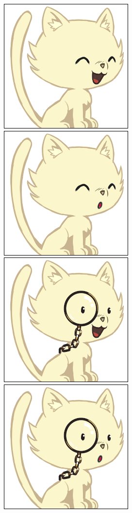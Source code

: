 \documentclass[a4paper, 12pt]{article}
\begin{document}
  \includegraphics[scale=0.45]{out/1.png}
  \includegraphics[scale=0.45]{out/4.png}
  \includegraphics[scale=0.45]{out/7.png}
  \includegraphics[scale=0.45]{out/10.png}
\end{document}
